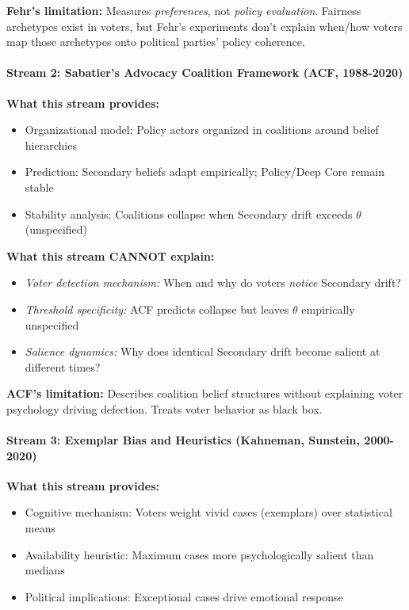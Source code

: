 \textbf{Fehr's limitation:} Measures \textit{preferences}, not \textit{policy evaluation}. Fairness
archetypes exist in voters, but Fehr's experiments don't explain when/how voters map those
archetypes onto political parties' policy coherence.

\paragraph{Stream 2: Sabatier's Advocacy Coalition Framework (ACF, 1988-2020)}

\textbf{What this stream provides:}
\begin{itemize}[nosep]
\item Organizational model: Policy actors organized in coalitions around belief hierarchies
\item Prediction: Secondary beliefs adapt empirically; Policy/Deep Core remain stable
\item Stability analysis: Coalitions collapse when Secondary drift exceeds $\theta$ (unspecified)
\end{itemize}

\textbf{What this stream CANNOT explain:}
\begin{itemize}[nosep]
\item \textit{Voter detection mechanism:} When and why do voters \textit{notice} Secondary drift?
\item \textit{Threshold specificity:} ACF predicts collapse but leaves $\theta$ empirically unspecified
\item \textit{Salience dynamics:} Why does identical Secondary drift become salient at different times?
\end{itemize}

\textbf{ACF's limitation:} Describes coalition belief structures without explaining voter psychology
driving defection. Treats voter behavior as black box.

\paragraph{Stream 3: Exemplar Bias and Heuristics (Kahneman, Sunstein, 2000-2020)}

\textbf{What this stream provides:}
\begin{itemize}[nosep]
\item Cognitive mechanism: Voters weight vivid cases (exemplars) over statistical means
\item Availability heuristic: Maximum cases more psychologically salient than medians
\item Political implications: Exceptional cases drive emotional response
\end{itemize}

